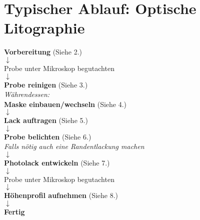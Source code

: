 \documentclass[12pt,a4paper]{article}
\begin{document}
\tableofcontents

\newpage

\section{Typischer Ablauf: Optische Litographie}
\begin{center}
\textbf{Vorbereitung} (Siehe 2.)\\
$\downarrow$\\
Probe unter Mikroskop begutachten\\
$\downarrow$\\
\textbf{Probe reinigen} (Siehe 3.)\\
\bigskip
\textit{Währendessen:}\\
\textbf{Maske einbauen/wechseln} (Siehe 4.)\\
$\downarrow$\\
\textbf{Lack auftragen} (Siehe 5.)\\
$\downarrow$\\
\textbf{Probe belichten} (Siehe 6.)\\
\textit{Falls nötig auch eine Randentlackung machen}\\
$\downarrow$\\
\textbf{Photolack entwickeln} (Siehe 7.)\\
$\downarrow$\\
Probe unter Mikroskop begutachten\\
$\downarrow$\\
\textbf{Höhenprofil aufnehmen} (Siehe 8.)\\
$\downarrow$\\
\textbf{Fertig}
\end{center}
\end{document}
